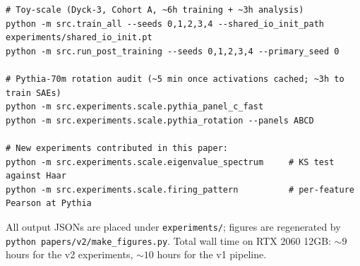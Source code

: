 \documentclass[11pt,letterpaper]{article}
\begin{document}
\begin{small}
\begin{verbatim}
# Toy-scale (Dyck-3, Cohort A, ~6h training + ~3h analysis)
python -m src.train_all --seeds 0,1,2,3,4 --shared_io_init_path experiments/shared_io_init.pt
python -m src.run_post_training --seeds 0,1,2,3,4 --primary_seed 0

# Pythia-70m rotation audit (~5 min once activations cached; ~3h to train SAEs)
python -m src.experiments.scale.pythia_panel_c_fast
python -m src.experiments.scale.pythia_rotation --panels ABCD

# New experiments contributed in this paper:
python -m src.experiments.scale.eigenvalue_spectrum     # KS test against Haar
python -m src.experiments.scale.firing_pattern          # per-feature Pearson at Pythia
\end{verbatim}
\end{small}

All output JSONs are placed under \texttt{experiments/}; figures are regenerated by \texttt{python papers/v2/make\_figures.py}. Total wall time on RTX 2060 12GB: ${\sim}9$ hours for the v2 experiments, ${\sim}10$ hours for the v1 pipeline.
\end{document}
